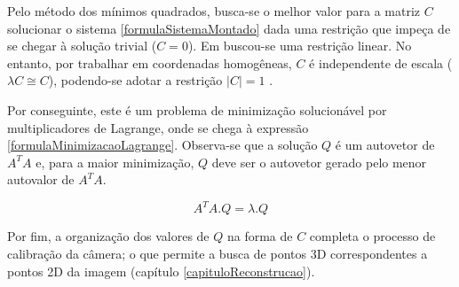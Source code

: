 	Pelo método dos mínimos quadrados, busca-se o melhor valor para a matriz $C$ solucionar o sistema \ref{formulaSistemaMontado} dada uma restrição que impeça de se chegar à solução trivial ($C = 0$). Em \cite{juizVirtual} buscou-se uma restrição linear. No entanto, por trabalhar em coordenadas homogêneas, $C$ é independente de escala ($\lambda C \cong C$), podendo-se adotar a restrição $|C| = 1$ \cite{lectureCameraCalibration}.
	
	Por conseguinte, este é um problema de minimização solucionável por multiplicadores de Lagrange, onde se chega à expressão \ref{formulaMinimizacaoLagrange}. Observa-se que a solução $Q$ é um autovetor de $A^TA$ e, para a maior minimização, $Q$ deve ser o autovetor gerado pelo menor autovalor de $A^TA$. \cite{lectureLeastSquares}
	
	\begin{equation}
		\label{formulaMinimizacaoLagrange}
		A^TA . Q = \lambda . Q
	\end{equation}
	
	Por fim, a organização dos valores de $Q$ na forma de $C$ completa o processo de calibração da câmera; o que permite a busca de pontos 3D correspondentes a pontos 2D da imagem (capítulo \ref{capituloReconstrucao}).
